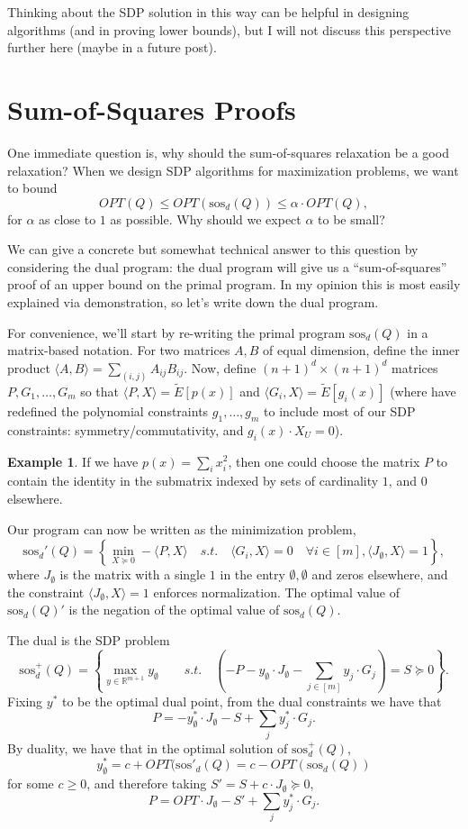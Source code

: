 \documentclass[a4paper,11pt]{article}
\newcommand{\R}{\mathbb{R}}
\newcommand{\sos}{\mathrm{sos}}
\theoremstyle{definition}
\newtheorem{example}{Example}
\begin{document}
Thinking about the SDP solution in this way can be helpful in designing algorithms (and in proving lower bounds), but I will not discuss this perspective further here (maybe in a future post).


\section{Sum-of-Squares Proofs}

One immediate question is, why should the sum-of-squares relaxation be a good relaxation?
When we design SDP algorithms for maximization problems, we want to bound
\[
OPT(Q) \le OPT(\sos_d(Q)) \le \alpha \cdot OPT(Q),
\]
for $\alpha$ as close to $1$ as possible.
Why should we expect $\alpha$ to be small?

We can give a concrete but somewhat technical answer to this question by considering the dual program: the dual program will give us a ``sum-of-squares'' proof of an upper bound on the primal program.
In my opinion this is most easily explained via demonstration, so let's write down the dual program.

For convenience, we'll start by re-writing the primal program $\sos_d(Q)$ in a matrix-based notation.
For two matrices $A,B$ of equal dimension, define the inner product $\langle A,B \rangle = \sum_{(i,j)} A_{ij} B_{ij}$.
Now, define $(n+1)^d \times (n+1)^d$ matrices $P,G_1,\ldots,G_{m}$ so that $\langle P, X \rangle = \tilde{E}[p(x)]$ and $\langle G_i,X\rangle = \tilde{E}[g_i(x)]$ (where have redefined the polynomial constraints $g_1,\ldots,g_m$ to include most of our SDP constraints: symmetry/commutativity, and $g_i(x)\cdot X_U = 0$).
\begin{example}
If we have $p(x) = \sum_{i}x_i^2$, then one could choose the matrix $P$ to contain the identity in the submatrix indexed by sets of cardinality $1$, and $0$ elsewhere.
\end{example}

Our program can now be written as the minimization problem,
\[
\sos_d'(Q) = \left\{ \min_{X\succeq 0} - \langle P,X\rangle \quad s.t.\quad \langle G_i,X\rangle = 0 \quad \forall i \in [m], \langle J_{\emptyset},X\rangle = 1 \right\},
\]
where $J_{\emptyset}$ is the matrix with a single $1$ in the entry $\emptyset,\emptyset$ and zeros elsewhere, and the constraint $\langle J_\emptyset, X\rangle = 1$ enforces normalization.
The optimal value of $\sos_d(Q)'$ is the negation of the optimal value of $\sos_d(Q)$.

The dual is the SDP problem
\[
\sos_d^+(Q) = \left\{ \max_{y\in \R^{m+1}} y_{\emptyset} \qquad s.t.\quad \left(-P - y_{\emptyset}\cdot J_{\emptyset} - \sum_{j\in[m]}y_j \cdot G_j\right) = S \succeq 0 \right\}.
\]
Fixing $y^*$ to be the optimal dual point, from the dual constraints we have that
\[
P = -y^*_{\emptyset} \cdot J_{\emptyset} - S + \sum_{j} y^*_j\cdot G_j.
\]
By duality, we have that in the optimal solution of $\sos_d^+(Q)$,
\[
y_{\emptyset}^*= c + OPT(\sos'_d(Q) = c - OPT(\sos_d(Q))
\]
for some $c \ge 0$, and therefore taking $S' = S + c\cdot J_{\emptyset} \succeq 0$,
\[
P = OPT \cdot J_{\emptyset} - S' + \sum_{j} y^*_j\cdot G_j.
\]
\end{document}
